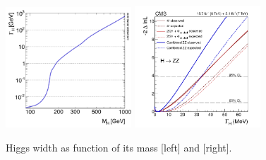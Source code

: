 \begin{figure}[!Hhtbp]
  \begin{center}
    \includegraphics[width=0.42\textwidth]{figs/u0g5o.png}
    \includegraphics[width=0.42\textwidth]{figs/AllFitPaper_30_04_14_MeV.png}
    \caption{Higgs width as function of its mass [left] and  [right].}
    \label{fig:WidthHiggs}
  \end{center}
\end{figure}

